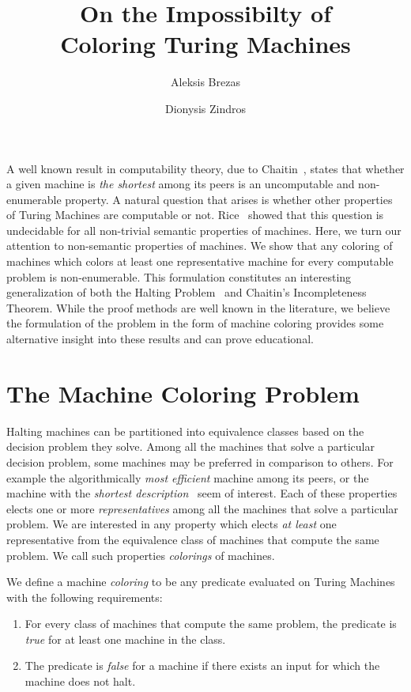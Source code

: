 \documentclass[runningheads]{format/llncs}
\title{
    On the Impossibilty of\\
    Coloring Turing Machines
}
\author{Aleksis Brezas\and Dionysis Zindros\inst{1}}
\institute{University of Athens}
\begin{document}
\maketitle

A well known result in computability theory, due to
Chaitin~\cite{chaitin}, states that whether
a given machine is \emph{the shortest} among its peers is an
uncomputable and non-enumerable property. A natural question
that arises is whether other properties of Turing Machines are
computable or not. Rice~\cite{rice} showed that this question
is undecidable for all non-trivial semantic properties of machines.
Here, we turn our attention to non-semantic properties of
machines. We show that any coloring of machines which colors
at least one representative machine for every computable problem
is non-enumerable. This formulation constitutes an interesting
generalization of both the Halting Problem~\cite{turing} and
Chaitin's Incompleteness Theorem. While the proof methods are
well known in the literature, we believe the formulation of the
problem in the form of machine coloring provides some alternative
insight into these results and can prove educational.

\section{The Machine Coloring Problem}
Halting machines can be partitioned into equivalence classes based
on the decision problem they solve.
Among all the machines that solve a particular decision problem, some machines
may be preferred in comparison to others. For example the
algorithmically \emph{most efficient} machine among its peers, or the
machine with the \emph{shortest description}~\cite{kolmogorov} seem of interest.
Each of these properties elects one or more \emph{representatives} among
all the machines that solve a particular problem. We are interested
in any property which elects \emph{at least} one representative from
the equivalence class of machines that compute the same problem.
We call such properties \emph{colorings} of machines.

\begin{definition}
We define a machine \emph{coloring} to be any predicate evaluated
on Turing Machines with the following requirements:

\begin{enumerate}
    \item For every class of machines that compute the
          same problem, the predicate
          is \emph{true} for at least one machine in the class.

    \item The predicate is \emph{false} for a machine if there
          exists an input for which the machine does not halt.
\end{enumerate}
\end{definition}
\end{document}
